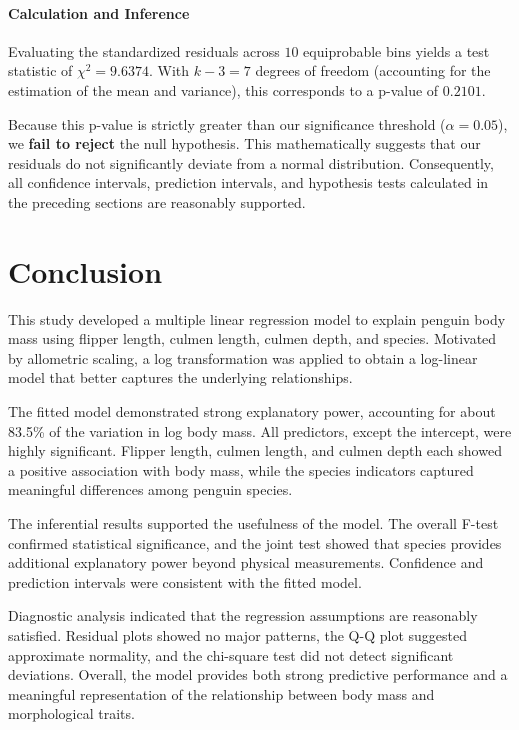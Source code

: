 \documentclass[12pt]{article}
\begin{document}
  \paragraph{Calculation and Inference}
  Evaluating the standardized residuals across $10$ equiprobable
  bins yields a test statistic of $\chi^2 = 9.6374$. With
  $k-3 = 7$ degrees of freedom (accounting for the estimation
  of the mean and variance), this corresponds to a p-value of
  $0.2101$.

  Because this p-value is strictly greater than our significance
  threshold ($\alpha = 0.05$), we \textbf{fail to reject} the
  null hypothesis. This mathematically suggests that our residuals
  do not significantly deviate from a normal distribution.
  Consequently, all confidence intervals, prediction intervals,
  and hypothesis tests calculated in the preceding sections are
  reasonably supported.


  \section{Conclusion}

  This study developed a multiple linear regression model to
  explain penguin body mass using flipper length, culmen
  length, culmen depth, and species. Motivated by allometric
  scaling, a log transformation was applied to obtain a
  log-linear model that better captures the underlying
  relationships.

  The fitted model demonstrated strong explanatory power,
  accounting for about 83.5\% of the variation in log body
  mass. All predictors, except the intercept, were highly
  significant. Flipper length, culmen length, and culmen depth
  each showed a positive association with body mass, while the
  species indicators captured meaningful differences among
  penguin species.

  The inferential results supported the usefulness of the
  model. The overall F-test confirmed statistical significance,
  and the joint test showed that species provides additional
  explanatory power beyond physical measurements. Confidence
  and prediction intervals were consistent with the fitted
  model.

  Diagnostic analysis indicated that the regression assumptions
  are reasonably satisfied. Residual plots showed no major
  patterns, the Q-Q plot suggested approximate normality, and
  the chi-square test did not detect significant deviations.
  Overall, the model provides both strong predictive
  performance and a meaningful representation of the
  relationship between body mass and morphological traits.
\end{document}
